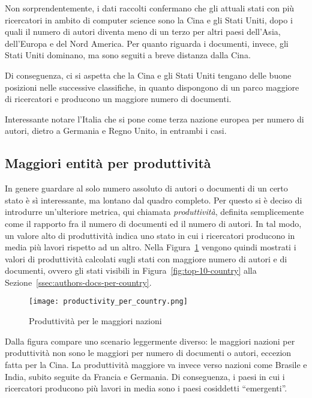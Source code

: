 Non sorprendentemente, i dati raccolti confermano che gli attuali stati
con più ricercatori in ambito di computer science sono la Cina e gli Stati Uniti,
dopo i quali il numero di autori diventa meno di un terzo per altri paesi
dell'Asia, dell'Europa e del Nord America.
Per quanto riguarda i documenti, invece, gli Stati Uniti dominano, ma sono
seguiti a breve distanza dalla Cina.

Di conseguenza, ci si aspetta che la Cina e gli Stati Uniti tengano delle buone
posizioni nelle successive classifiche, in quanto dispongono di un parco maggiore
di ricercatori e producono un maggiore numero di documenti.

Interessante notare l'Italia che si pone come terza nazione europea per numero
di autori, dietro a Germania e Regno Unito, in entrambi i casi.

\subsection{Maggiori entità per produttività}

In genere guardare al solo numero assoluto di autori o documenti di un certo
stato è sì interessante, ma lontano dal quadro completo. Per questo si è
deciso di introdurre un'ulteriore metrica, qui chiamata \textit{produttività},
definita semplicemente come il rapporto fra il numero di documenti ed il
numero di autori. In tal modo, un valore alto di produttività indica uno
stato in cui i ricercatori producono in media più lavori rispetto ad un
altro. Nella Figura~\ref{fig:productivity-per-country} vengono quindi mostrati i valori
di produttività calcolati sugli stati con maggiore numero di autori e di
documenti, ovvero gli stati visibili in Figura~\ref{fig:top-10-country} alla
Sezione~\ref{ssec:authors-docs-per-country}.

\begin{figure}[tb]
  \centering
  \texttt{[image: productivity\_per\_country.png]}
  \caption{Produttività per le maggiori nazioni}
  \label{fig:productivity-per-country}
\end{figure}

Dalla figura compare uno scenario leggermente diverso: le maggiori nazioni
per produttività non sono le maggiori per numero di documenti o autori, eccezion
fatta per la Cina. La produttività maggiore va invece verso nazioni come Brasile
e India, subito seguite da Francia e Germania.
Di conseguenza, i paesi in cui i ricercatori producono più lavori in media
sono i paesi cosiddetti ``emergenti''.

